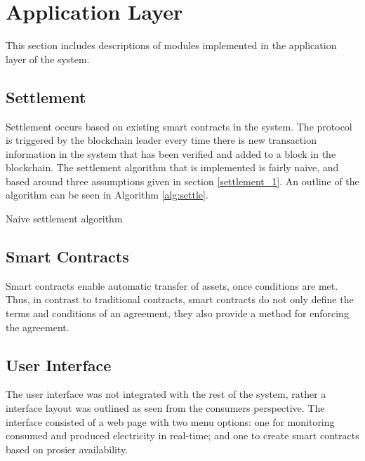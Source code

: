 \section{Application Layer}
This section includes descriptions of modules implemented in the application layer of the system. 

\subsection{Settlement} \label{settlement}
Settlement occurs based on existing smart contracts in the system. The protocol is triggered by the blockchain leader every time there is new transaction information in the system that has been verified and added to a block in the blockchain. The settlement algorithm that is implemented is fairly naive, and based around three assumptions given in section \ref{settlement_1}. An outline of the algorithm can be seen in Algorithm \ref{alg:settle}.

\begin{algorithm}[!htb]
\DontPrintSemicolon
\SetAlgoLined
{}
\BlankLine

\caption{Naive settlement algorithm}
\label{alg:settle}
\end{algorithm}

\subsection{Smart Contracts}
Smart contracts enable automatic transfer of assets, once conditions are met. Thus, in contrast to traditional contracts, smart contracts do not only define the terms and conditions of an agreement, they also provide a method for enforcing the agreement.

\subsection{User Interface}
The user interface was not integrated with the rest of the system, rather a interface layout was outlined as seen from the consumers perspective. The interface consisted of a web page with two menu options: one for monitoring consumed and produced electricity in real-time; and one to create smart contracts based on prosier availability.

